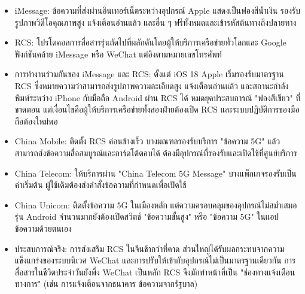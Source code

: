\begin{itemize}
  \item iMessage: ข้อความที่ส่งผ่านอินเทอร์เน็ตระหว่างอุปกรณ์ Apple แสดงเป็นฟองสีน้ำเงิน รองรับรูปภาพวิดีโอคุณภาพสูง แจ้งเตือนอ่านแล้ว และอื่น ๆ ฟรีทั้งหมดและเข้ารหัสต้นทางถึงปลายทาง
  \item RCS: โปรโตคอลการสื่อสารรุ่นถัดไปที่ผลักดันโดยผู้ให้บริการเครือข่ายทั่วโลกและ Google ฟังก์ชันคล้าย iMessage หรือ WeChat แต่อิงตามหมายเลขโทรศัพท์
  \item การทำงานร่วมกันของ iMessage และ RCS: ตั้งแต่ iOS 18 Apple เริ่มรองรับมาตรฐาน RCS ซึ่งหมายความว่าสามารถส่งรูปภาพความละเอียดสูง แจ้งเตือนอ่านแล้ว และสถานะกำลังพิมพ์ระหว่าง iPhone กับมือถือ Android ผ่าน RCS ได้ หมดยุคประสบการณ์ "ฟองสีเขียว" ที่ขาดตอน แต่เงื่อนไขคือผู้ให้บริการเครือข่ายทั้งสองฝ่ายต้องเปิด RCS และระบบปฏิบัติการของมือถือต้องใหม่พอ
\end{itemize}


\begin{itemize}
  \item China Mobile: ติดตั้ง RCS ค่อนข้างเร็ว บางมณฑลรองรับบริการ "ข้อความ 5G" แล้ว สามารถส่งข้อความสื่อสมบูรณ์และการ์ดโต้ตอบได้ ต้องมีอุปกรณ์ที่รองรับและเปิดใช้ที่ศูนย์บริการ
  \item China Telecom: ให้บริการผ่าน "China Telecom 5G Message" บางแพ็กเกจรองรับเป็นค่าเริ่มต้น ผู้ใช้เดิมต้องส่งคำสั่งข้อความที่กำหนดเพื่อเปิดใช้
  \item China Unicom: ติดตั้งข้อความ 5G ในเมืองหลัก แต่ความครอบคลุมของอุปกรณ์ไม่สม่ำเสมอ รุ่น Android จำนวนมากยังต้องเปิดสวิตช์ "ข้อความขั้นสูง" หรือ "ข้อความ 5G" ในแอปข้อความด้วยตนเอง
  \item ประสบการณ์จริง: การส่งเสริม RCS ในจีนช้ากว่าที่คาด ส่วนใหญ่ได้รับผลกระทบจากความแข็งแกร่งของระบบนิเวศ WeChat และการปรับให้เข้ากับอุปกรณ์ไม่เป็นมาตรฐานเดียวกัน การสื่อสารในชีวิตประจำวันยังพึ่ง WeChat เป็นหลัก RCS จึงมักทำหน้าที่เป็น "ช่องทางแจ้งเตือนทางการ" (เช่น การแจ้งเตือนจากธนาคาร ข้อความจากรัฐบาล)
\end{itemize}

